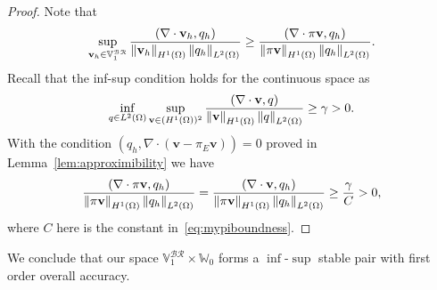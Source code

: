 \begin{proof}
Note that
		  \begin{equation}
					 \sup_{\mathbf{v}_h \in \mathbb{V}_1^{\mathcal{BR}}} \frac{(\nabla \cdot \mathbf{v}_h, q_h)}{\left\lVert\mathbf{v}_h\right\rVert_{H^1(\Omega)}\left\lVert q_h\right\rVert_{L^2(\Omega)}} \geq \frac{(\nabla \cdot \pi\mathbf{v}, q_h)}{\left\lVert\pi \mathbf{v}\right\rVert_{H^1(\Omega)} \left\lVert q_h\right\rVert_{L^2(\Omega)}}.
		  \end{equation}
		  Recall that the inf-sup condition holds for the continuous space as
		  \begin{equation}
					 \inf_{q \in L^2(\Omega)} \sup_{\mathbf{v} \in (H^1(\Omega))^2} \frac{(\nabla \cdot \mathbf{v}, q)}{\left\lVert\mathbf{v}\right\rVert_{H^1(\Omega)}\left\lVert q\right\rVert_{L^2(\Omega)}} \geq \gamma >0.
		  \end{equation}
		  With the condition $(q_h, \nabla \cdot (\mathbf{v} - \pi_E \mathbf{v})) = 0$ proved in Lemma~\ref{lem:approximibility} 
		  we have
		  \begin{equation}
 \frac{(\nabla \cdot \pi\mathbf{v}, q_h)}{\left\lVert\pi \mathbf{v}\right\rVert_{H^1(\Omega)} \left\lVert q_h\right\rVert_{L^2(\Omega)}} = \frac{(\nabla \cdot \mathbf{v}, q_h)}{\left\lVert\pi \mathbf{v}\right\rVert_{H^1(\Omega)} \left\lVert q_h\right\rVert_{L^2(\Omega)}} \geq  \frac{\gamma}{C} > 0,
		  \end{equation}
where $C$ here is the constant in~\eqref{eq:mypiboundness}.
\end{proof}
We conclude that our space $\mathbb{V}_1^{\mathcal{BR}} \times \mathbb{W}_0$ 
forms a $\inf$-$\sup$ stable pair with first order overall accuracy.


